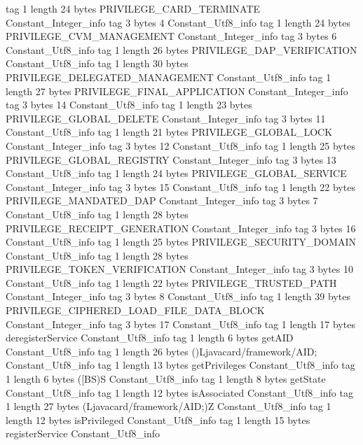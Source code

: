 {{{			tag	1
			length	24
			bytes	PRIVILEGE_CARD_TERMINATE
		}
		Constant_Integer_info {
			tag	3
			bytes	4
		}
		Constant_Utf8_info {
			tag	1
			length	24
			bytes	PRIVILEGE_CVM_MANAGEMENT
		}
		Constant_Integer_info {
			tag	3
			bytes	6
		}
		Constant_Utf8_info {
			tag	1
			length	26
			bytes	PRIVILEGE_DAP_VERIFICATION
		}
		Constant_Utf8_info {
			tag	1
			length	30
			bytes	PRIVILEGE_DELEGATED_MANAGEMENT
		}
		Constant_Utf8_info {
			tag	1
			length	27
			bytes	PRIVILEGE_FINAL_APPLICATION
		}
		Constant_Integer_info {
			tag	3
			bytes	14
		}
		Constant_Utf8_info {
			tag	1
			length	23
			bytes	PRIVILEGE_GLOBAL_DELETE
		}
		Constant_Integer_info {
			tag	3
			bytes	11
		}
		Constant_Utf8_info {
			tag	1
			length	21
			bytes	PRIVILEGE_GLOBAL_LOCK
		}
		Constant_Integer_info {
			tag	3
			bytes	12
		}
		Constant_Utf8_info {
			tag	1
			length	25
			bytes	PRIVILEGE_GLOBAL_REGISTRY
		}
		Constant_Integer_info {
			tag	3
			bytes	13
		}
		Constant_Utf8_info {
			tag	1
			length	24
			bytes	PRIVILEGE_GLOBAL_SERVICE
		}
		Constant_Integer_info {
			tag	3
			bytes	15
		}
		Constant_Utf8_info {
			tag	1
			length	22
			bytes	PRIVILEGE_MANDATED_DAP
		}
		Constant_Integer_info {
			tag	3
			bytes	7
		}
		Constant_Utf8_info {
			tag	1
			length	28
			bytes	PRIVILEGE_RECEIPT_GENERATION
		}
		Constant_Integer_info {
			tag	3
			bytes	16
		}
		Constant_Utf8_info {
			tag	1
			length	25
			bytes	PRIVILEGE_SECURITY_DOMAIN
		}
		Constant_Utf8_info {
			tag	1
			length	28
			bytes	PRIVILEGE_TOKEN_VERIFICATION
		}
		Constant_Integer_info {
			tag	3
			bytes	10
		}
		Constant_Utf8_info {
			tag	1
			length	22
			bytes	PRIVILEGE_TRUSTED_PATH
		}
		Constant_Integer_info {
			tag	3
			bytes	8
		}
		Constant_Utf8_info {
			tag	1
			length	39
			bytes	PRIVILEGE_CIPHERED_LOAD_FILE_DATA_BLOCK
		}
		Constant_Integer_info {
			tag	3
			bytes	17
		}
		Constant_Utf8_info {
			tag	1
			length	17
			bytes	deregisterService
		}
		Constant_Utf8_info {
			tag	1
			length	6
			bytes	getAID
		}
		Constant_Utf8_info {
			tag	1
			length	26
			bytes	()Ljavacard/framework/AID;
		}
		Constant_Utf8_info {
			tag	1
			length	13
			bytes	getPrivileges
		}
		Constant_Utf8_info {
			tag	1
			length	6
			bytes	([BS)S
		}
		Constant_Utf8_info {
			tag	1
			length	8
			bytes	getState
		}
		Constant_Utf8_info {
			tag	1
			length	12
			bytes	isAssociated
		}
		Constant_Utf8_info {
			tag	1
			length	27
			bytes	(Ljavacard/framework/AID;)Z
		}
		Constant_Utf8_info {
			tag	1
			length	12
			bytes	isPrivileged
		}
		Constant_Utf8_info {
			tag	1
			length	15
			bytes	registerService
		}
		Constant_Utf8_info {
}}}
